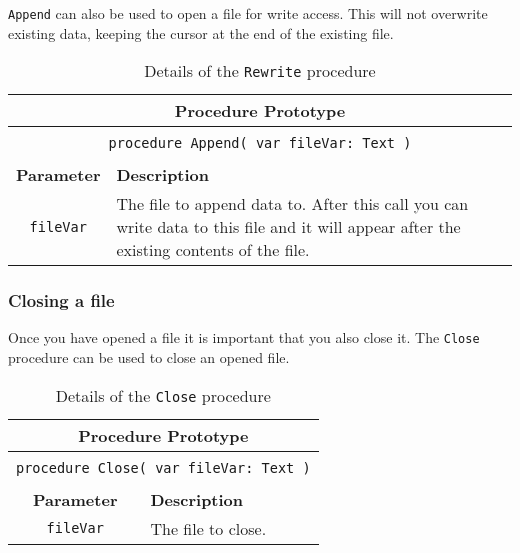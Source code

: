 \clearpage

\texttt{Append} can also be used to open a file for write access. This will not overwrite existing data, keeping the cursor at the end of the existing file.

\begin{table}[h]
  \centering
  \begin{tabular}{|c|p{9.5cm}|}
    \hline
    \multicolumn{2}{|c|}{\textbf{Procedure Prototype}} \\
    \hline
    \multicolumn{2}{|c|}{} \\
    \multicolumn{2}{|c|}{\texttt{procedure Append( var fileVar: Text )}} \\
    \multicolumn{2}{|c|}{} \\
    \hline
    \textbf{Parameter} & \textbf{Description} \\
    \hline
    \texttt{ fileVar } & The file to append data to. After this call you can write data to this file and it will appear after the existing contents of the file.\\
    \hline
  \end{tabular}
  \caption{Details of the \texttt{Rewrite} procedure}
  \label{tbl:reset}
\end{table}


\subsubsection{Closing a file} %
\label{ssub:closing_a_file}

Once you have opened a file it is important that you also close it. The \texttt{Close} procedure can be used to close an opened file.

\begin{table}[h]
  \centering
  \begin{tabular}{|c|p{9.5cm}|}
    \hline
    \multicolumn{2}{|c|}{\textbf{Procedure Prototype}} \\
    \hline
    \multicolumn{2}{|c|}{} \\
    \multicolumn{2}{|c|}{\texttt{procedure Close( var fileVar: Text )}} \\
    \multicolumn{2}{|c|}{} \\
    \hline
    \textbf{Parameter} & \textbf{Description} \\
    \hline
    \texttt{ fileVar } & The file to close. \\
    \hline
  \end{tabular}
  \caption{Details of the \texttt{Close} procedure}
  \label{tbl:close}
\end{table}

